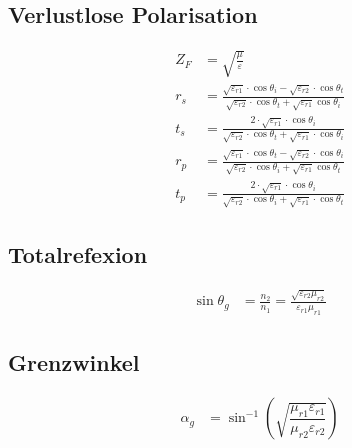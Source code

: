 \subsection{Verlustlose Polarisation}
\begin{align*}
    Z_F & = \sqrt{\frac{\mu}{\varepsilon}}                                                                                                                                             \\
    r_s & = \frac{\sqrt{\varepsilon_{r1}}\cdot\cos\theta_i - \sqrt{\varepsilon_{r2}}\cdot\cos\theta_t}{\sqrt{\varepsilon_{r2}}\cdot\cos\theta_t + \sqrt{\varepsilon_{r1}}\cos\theta_i} \\
    t_s & = \frac{2\cdot\sqrt{\varepsilon_{r1}}\cdot\cos\theta_i}{\sqrt{\varepsilon_{r2}}\cdot\cos\theta_t + \sqrt{\varepsilon_{r1}}\cdot\cos\theta_i}                                 \\
    r_p & = \frac{\sqrt{\varepsilon_{r1}}\cdot\cos\theta_t - \sqrt{\varepsilon_{r2}}\cdot\cos\theta_i}{\sqrt{\varepsilon_{r2}}\cdot\cos\theta_i + \sqrt{\varepsilon_{r1}}\cos\theta_t} \\
    t_p & = \frac{2\cdot\sqrt{\varepsilon_{r1}}\cdot\cos\theta_i}{\sqrt{\varepsilon_{r2}}\cdot\cos\theta_i + \sqrt{\varepsilon_{r1}}\cdot\cos\theta_t}
\end{align*}

\subsection{Totalrefexion}
\begin{align*}
    \sin\theta_g & = \frac{n_2}{n_1} = \frac{\sqrt{\varepsilon_{r2}\mu_{r2}}}{\varepsilon_{r1}\mu_{r1}}
\end{align*}

\subsection{Grenzwinkel}
\begin{align*}
    \alpha_g & = \sin^{-1} \left( \sqrt{ \dfrac{\mu_{r1} \varepsilon_{r1}}{\mu_{r2} \varepsilon_{r2}}} \right)
\end{align*}

